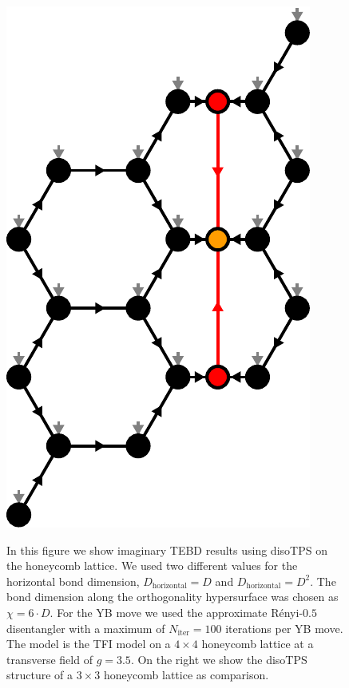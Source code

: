 \begin{figure}
\begin{minipage}{1.0\textwidth}
%
		\quad\quad
		\raisebox{15pt}
		{%
			\includegraphics[scale=0.5]{figures/tikz/TFI/hexagonal_lattice/hexagonal_lattice_structure.pdf}
		}
	\end{minipage}
	\caption{In this figure we show imaginary TEBD results using disoTPS on the honeycomb lattice. We used two different values for the horizontal bond dimension, $D_\text{horizontal} = D$ and $D_\text{horizontal} = D^2$. The bond dimension along the orthogonality hypersurface was chosen as $\chi = 6\cdot D$. For the YB move we used the approximate Rényi-$0.5$ disentangler with a maximum of $N_\text{iter} = 100$ iterations per YB move. The model is the TFI model on a $4\times 4$ honeycomb lattice at a transverse field of $g = 3.5$. On the right we show the disoTPS structure of a $3\times 3$ honeycomb lattice as comparison.}
	\label{fig:tfi_gs_energy_vs_dtau_honeycomb}
\end{figure}